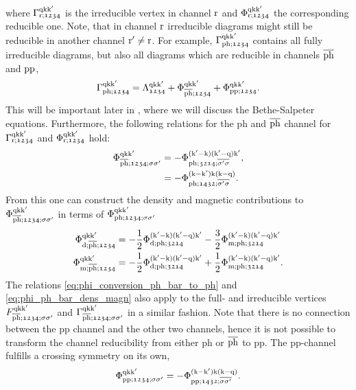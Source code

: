 \documentclass[../../main.tex]{subfiles}
\begin{document}
where $\Gamma_{\text{r};\mathfrak{1234}}^{\text{q}\text{k}\text{k}'}$ is the irreducible vertex in channel $\text{r}$ and $\Phi_{\text{r};\mathfrak{1234}}^{\text{q}\text{k}\text{k}'}$ the corresponding reducible one. Note, that in channel $\text{r}$ irreducible diagrams might still be reducible in another channel $\text{r}'\neq \text{r}$. For example, $\Gamma_{\text{ph};\mathfrak{1234}}^{\text{q}\text{k}\text{k}'}$ contains all fully irreducible diagrams, but also all diagrams which are reducible in channels $\overline{\text{ph}}$ and $\text{pp}$,
\begin{align}
	\Gamma_{\text{ph};\mathfrak{1234}}^{\text{q}\text{k}\text{k}'}=\Lambda_{\mathfrak{1234}}^{\text{q}\text{k}\text{k}'}+\Phi_{\overline{\text{ph}};\mathfrak{1234}}^{\text{q}\text{k}\text{k}'}+\Phi_{\text{pp};\mathfrak{1234}}^{\text{q}\text{k}\text{k}'}.
\end{align}
This will be important later in , where we will discuss the Bethe-Salpeter equations. Furthermore, the following relations for the ph and $\overline{\text{ph}}$ channel for $\Gamma_{\text{r};\mathfrak{1234}}^{\text{q}\text{k}\text{k}'}$ and $\Phi_{\text{r};\mathfrak{1234}}^{\text{q}\text{k}\text{k}'}$ hold:
\begin{subequations}\label{eq:phi_conversion_ph_bar_to_ph}
\begin{align}
	\Phi_{\overline{\text{ph}};\mathfrak{1234};\sigma\sigma'}^{\text{q}\text{k}\text{k}'}&=-\Phi_{\text{ph};\mathfrak{3214};\overline{\sigma'\sigma}}^{(\text{k}'-\text{k})(\text{k}'-\text{q})\text{k}'},\\
	&=-\Phi_{\text{ph};\mathfrak{1432};\overline{\sigma'\sigma}}^{(\text{k}-\text{k}')\text{k}(\text{k}-\text{q})}.
\end{align}
\end{subequations}
From this one can construct the density and magnetic contributions to $\Phi_{\overline{\text{ph}};\mathfrak{1234};\sigma\sigma'}^{\text{q}\text{k}\text{k}'}$ in terms of $\Phi_{\text{ph};\mathfrak{1234};\sigma\sigma'}^{\text{q}\text{k}\text{k}'}$
\begin{subequations}\label{eq:phi_ph_bar_dens_magn}
\begin{align}
	\Phi_{\text{d};\overline{\text{ph}};\mathfrak{1234}}^{\text{q}\text{k}\text{k}'}&=-\frac12\Phi_{\text{d};\text{ph};\mathfrak{3214}}^{(\text{k}'-\text{k})(\text{k}'-\text{q})\text{k}'}-\frac32\Phi_{\text{m};\text{ph};\mathfrak{3214}}^{(\text{k}'-\text{k})(\text{k}'-\text{q})\text{k}'}\\
	\Phi_{\text{m};\overline{\text{ph}};\mathfrak{1234}}^{\text{q}\text{k}\text{k}'}&=-\frac12\Phi_{\text{d};\text{ph};\mathfrak{3214}}^{(\text{k}'-\text{k})(\text{k}'-\text{q})\text{k}'}+\frac12\Phi_{\text{m};\text{ph};\mathfrak{3214}}^{(\text{k}'-\text{k})(\text{k}'-\text{q})\text{k}'}.
\end{align}
\end{subequations}
The relations \eqref{eq:phi_conversion_ph_bar_to_ph} and \eqref{eq:phi_ph_bar_dens_magn} also apply to the full- and irreducible vertices $F_{\overline{\text{ph}};\mathfrak{1234};\sigma\sigma'}^{\text{q}\text{k}\text{k}'}$ and $\Gamma_{\overline{\text{ph}};\mathfrak{1234};\sigma\sigma'}^{\text{q}\text{k}\text{k}'}$ in a similar fashion. Note that there is no connection between the pp channel and the other two channels, hence it is not possible to transform the channel reducibility from either ph or $\overline{\text{ph}}$ to pp. The pp-channel fulfills a crossing symmetry on its own,
\begin{align}
	\Phi^{\text{q}\text{k}\text{k}'}_{\text{pp};\mathfrak{1234};\sigma\sigma'}=-\Phi^{(\text{k}-\text{k}')\text{k}(\text{k}-\text{q})}_{\text{pp};\mathfrak{1432};\overline{\sigma\sigma'}}.
\end{align}
\end{document}
